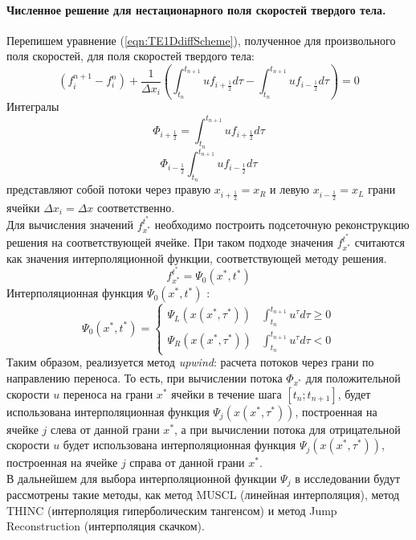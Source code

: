 \documentclass[10pt,a4paper]{article}
\begin{document}
\paragraph{Численное решение для нестационарного поля скоростей твердого тела.}
Перепишем уравнение (\ref{eqn:TE1DdiffScheme}), полученное для произвольного поля скоростей, для поля скоростей твердого тела:
\[
(f_i^{n+1}-f_i^n)
+
\frac{1}{\Delta x_i} (
\int_{t_n}^{t_{n+1}}
{u}f_{i+\frac{1}{2}}d\tau
-
\int_{t_n}^{t_{n+1}}
{u}f_{i-\frac{1}{2}}d\tau
)=0
\]
Интегралы
\begin{equation}
\label{eqn:FlowR}
\Phi_{i+\frac{1}{2}}=\int_{t_n}^{t_{n+1}}
{u}f_{i+\frac{1}{2}}d\tau
\end{equation}
\begin{equation}
\label{eqn:FlowL}
\Phi_{i-\frac{1}{2}}\int_{t_n}^{t_{n+1}}
{u}f_{i-\frac{1}{2}}d\tau
\end{equation}
представляют собой потоки через правую $x_{i+\frac{1}{2}}=x_R$ и левую $x_{i-\frac{1}{2}}=x_L$ грани ячейки $\Delta x_i = \Delta x$ соответственно.\\

Для вычисления значений $f_{x^*}^{t^*}$ необходимо построить подсеточную реконструкцию решения на соответствующей ячейке. При таком подходе значения $f_{x^*}^{t^*}$ считаются как значения интерполяционной функции, соответствующей методу решения.
\[
f_{x^*}^{t^*} = \Psi_0(x^*, t^*)
\]
Интерполяционная функция $\Psi_0(x^*, t^*)$ :
\begin{equation}
\label{eqn:PsyIntrpolationFunc}
\Psi_0(x^*, t^*) = \begin{cases}
\Psi_{L}(x(x^*,\tau^*))
& \int_{t_n}^{t_{n+1}} u^{\tau}d\tau\geq0
\\
\Psi_{R}(x(x^*,\tau^*))
& \int_{t_n}^{t_{n+1}} u^{\tau}d\tau < 0
\end{cases}
\end{equation}
Таким образом, реализуется метод \textit{upwind}: расчета потоков через грани по направлению переноса.
То есть, при вычислении потока $\Phi_{x^*}$ для положительной скорости $u$ переноса на грани $x^*$ ячейки в течение шага $[t_n; t_{n+1}]$, будет использована интерполяционная функция $\Psi_{j}(x(x^*,\tau^*))$, построенная на ячейке $j$ слева от данной грани $x^*$, а при вычислении потока для отрицательной скорости $u$ будет использована интерполяционная функция $\Psi_{j}(x(x^*,\tau^*))$, построенная на ячейке $j$ справа от данной грани $x^*$.\\

В дальнейшем для выбора интерполяционной функции $\Psi_{j}$ в исследовании будут рассмотрены такие методы, как метод MUSCL (линейная интерполяция), метод THINC (интерполяция гиперболическим тангенсом) и метод Jump Reconstruction (интерполяция скачком).\\
\end{document}

